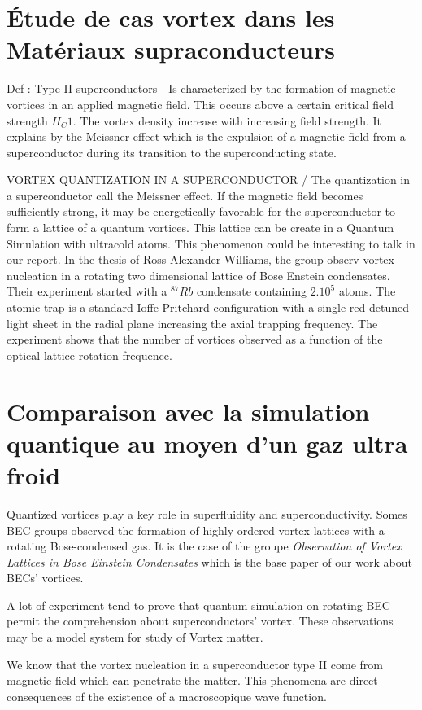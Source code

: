 \documentclass[a4paper]{article}
\begin{document}
\begin{multicols}{2}
\section{Étude de cas vortex dans les Matériaux supraconducteurs}

Def : Type II superconductors -
Is characterized by the formation of magnetic vortices in an applied magnetic field. This occurs above a certain critical field strength $H_C1$. The vortex density increase with increasing field strength. It explains by the Meissner effect which is the expulsion of a magnetic field from a superconductor during its transition to the superconducting state.

VORTEX QUANTIZATION IN A SUPERCONDUCTOR /
The quantization in a superconductor call the Meissner effect. If the magnetic field becomes sufficiently strong, it may be energetically favorable for the superconductor to form a lattice of a quantum vortices. This lattice can be create in a Quantum Simulation with ultracold atoms. This phenomenon could be interesting to talk in our report. 
In the thesis of Ross Alexander Williams, the group observ vortex nucleation in a rotating two dimensional lattice of Bose Enstein condensates. Their experiment started with a $^{87}Rb$ condensate containing $2.10^{5}$ atoms. The atomic trap is a standard Ioffe-Pritchard configuration with a single red detuned light sheet in the radial plane increasing the axial trapping frequency. 
The experiment shows that the number of vortices observed as a function of the optical lattice rotation frequence. 


\section{Comparaison avec la simulation quantique au moyen d'un gaz ultra froid}

Quantized vortices play a key role in superfluidity and superconductivity. Somes BEC groups observed the formation of highly ordered vortex lattices with a rotating Bose-condensed gas. It is the case of the groupe \textit{Observation of Vortex Lattices in Bose Einstein Condensates} which is the base paper of our work about BECs' vortices.

A lot of experiment tend to prove that quantum simulation on rotating BEC permit the comprehension about superconductors' vortex. These observations may be a model system for study of Vortex matter. 

We know that the vortex nucleation in a superconductor type II come from magnetic field which can penetrate the matter. This phenomena are direct consequences of the existence of a macroscopique wave function.


\end{multicols}
\end{document}
